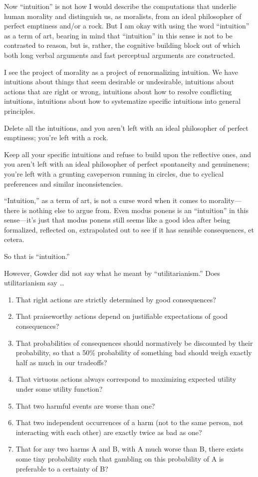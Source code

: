 {
 Now ``intuition'' is not how I
would describe the computations that underlie human morality and
distinguish us, as moralists, from an ideal philosopher of perfect
emptiness and/or a rock. But I am okay with using the word
``intuition'' as a term of art,
bearing in mind that ``intuition''
in this sense is not to be contrasted to reason, but is, rather, the
cognitive building block out of which both long verbal arguments and
fast perceptual arguments are constructed.}

{
 I see the project of morality as a project of renormalizing
intuition. We have intuitions about things that seem desirable or
undesirable, intuitions about actions that are right or wrong,
intuitions about how to resolve conflicting intuitions, intuitions
about how to systematize specific intuitions into general principles.}

{
 Delete all the intuitions, and you aren't left
with an ideal philosopher of perfect emptiness; you're
left with a rock.}

{
 Keep all your specific intuitions and refuse to build upon the
reflective ones, and you aren't left with an ideal
philosopher of perfect spontaneity and genuineness;
you're left with a grunting caveperson running in
circles, due to cyclical preferences and similar inconsistencies.}

{
 ``Intuition,'' as a term of
art, is not a curse word when it comes to morality---there is nothing
else to argue from. Even modus ponens is an
``intuition'' in this
sense---it's just that modus ponens still seems like a
good idea after being formalized, reflected on, extrapolated out to see
if it has sensible consequences, et cetera.}

{
 So that is ``intuition.''}

{
 However, Gowder did not say what he meant by
``utilitarianism.'' Does
utilitarianism say \ldots}

\begin{enumerate}
\item  That right actions are strictly determined by good consequences?
\item  That praiseworthy actions depend on justifiable expectations of
good consequences?
\item  That probabilities of consequences should normatively be
discounted by their probability, so that a 50\% probability of
something bad should weigh exactly half as much in our tradeoffs?
\item  That virtuous actions always correspond to maximizing expected
utility under some utility function?
\item  That two harmful events are worse than one?
\item  That two independent occurrences of a harm (not to the same
person, not interacting with each other) are exactly twice as bad as
one?
\item  That for any two harms A and B, with A much worse than B, there
exists some tiny probability such that gambling on this probability of
A is preferable to a certainty of B?
\end{enumerate}

